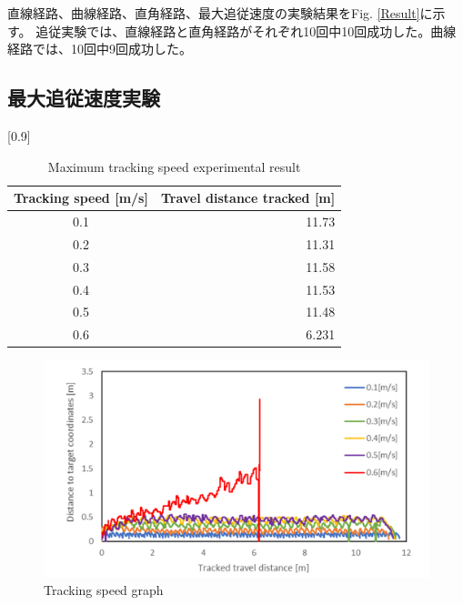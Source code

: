 直線経路、曲線経路、直角経路、最大追従速度の実験結果をFig. \ref{Result}に示す。
追従実験では、直線経路と直角経路がそれぞれ10回中10回成功した。曲線経路では、10回中9回成功した。

\subsection{最大追従速度実験}

\begin{table}[h]
  \begin{center}
    \caption{{Maximum tracking speed experimental result}\label{Maximum tracking speed experimental result}}
    \scalebox{1.0}[0.9]{
      \begin{tabular}{c|r} \hline
        Tracking speed [m/s] & Travel distance tracked [m] \\ \hline
        0.1 & 11.73 \\
        0.2 & 11.31 \\
        0.3 & 11.58 \\
        0.4 & 11.53 \\
        0.5 & 11.48 \\
        0.6 & 6.231 \\ \hline
      \end{tabular}
    }
  \end{center}
\end{table}

\begin{figure}[h]
  \begin{center}
  \includegraphics[width=150mm,clip]{figure/Maximum-tracking-speed-experimental-result.png}
  \caption{Tracking speed graph}
  \label{Tracking speed graph}
  \end{center}
\end{figure}

